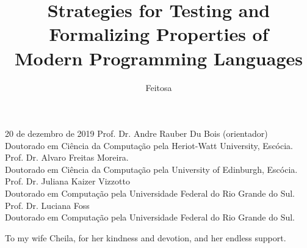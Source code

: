 \documentclass[tese,capa,english]{texufpel}
\title{Strategies for Testing and Formalizing Properties of \\Modern Programming Languages}
\author{Feitosa}{Samuel da Silva}
\begin{document}

\maketitle 

\sloppy

\fichacatalografica

\begin{aprovacao}{20 de dezembro de 2019} %
\noindent Prof. Dr. Andre Rauber Du Bois (orientador)\\
Doutorado em Ci\^{e}ncia da Computa\c{c}\~{a}o pela Heriot-Watt University, Esc\'{o}cia.\\[1cm]

\noindent Prof. Dr. Alvaro Freitas Moreira.\\
Doutorado em Ci\^{e}ncia da Computa\c{c}\~{a}o pela University of Edinburgh, Esc\'{o}cia.\\[1cm]

\noindent Prof. Dr. Juliana Kaizer Vizzotto\\
Doutorado em Computa\c{c}\~{a}o pela Universidade Federal do Rio Grande do Sul.\\[1cm]

\noindent Prof. Dr. Luciana Foss\\
Doutorado em Computa\c{c}\~{a}o pela Universidade Federal do Rio Grande do Sul.
\end{aprovacao}

\begin{dedicatoria}
  To my wife Cheila, for her kindness and devotion, and her endless support.
\end{dedicatoria}
\end{document}

